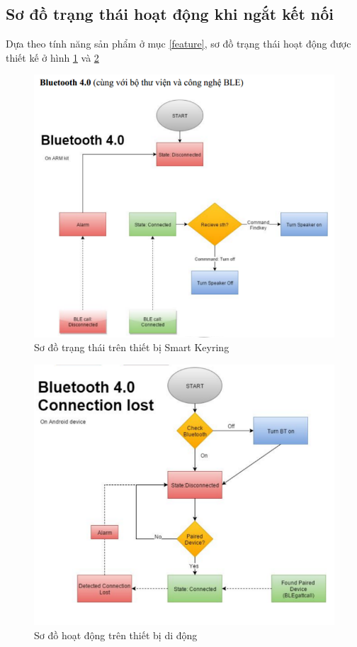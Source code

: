 \subsection{Sơ đồ trạng thái hoạt động khi ngắt kết nối}
Dựa theo tính năng sản phẩm ở mục \ref{feature}, sơ đồ trạng thái hoạt động được thiết kế ở hình \ref{fig: ble} và \ref{fig: blelost}

	\begin{figure}[H]
		\centering    
		\includegraphics[width=1.0\textwidth]{ble}
		\caption[Sơ đồ trạng thái trên thiết bị Smart Keyring]{Sơ đồ trạng thái trên thiết bị Smart Keyring}
		\label{fig: ble}
	\end{figure}
	
	\begin{figure}[H]
		\centering    
		\includegraphics[width=1.0\textwidth]{blelost}
		\caption[Sơ đồ hoạt động trên thiết bị di động]{Sơ đồ hoạt động trên thiết bị di động}
		\label{fig: blelost}
	\end{figure}

